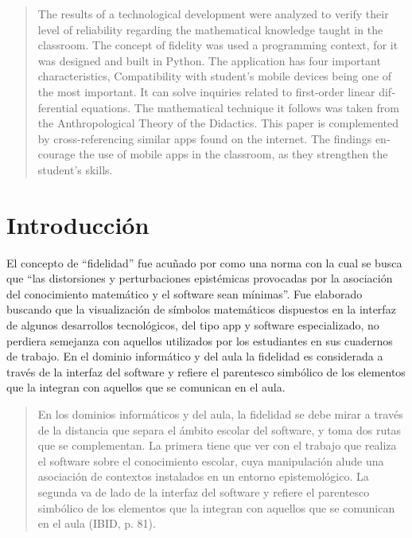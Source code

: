 \documentclass[spanish]{textolivre}
\begin{document}
\begin{polyabstract}
\begin{english}
\begin{abstract}
The results of a technological development were analyzed to verify their level of reliability regarding the mathematical knowledge taught in the classroom. The concept of fidelity was used a programming context, for it was designed and built in Python. The application has four important characteristics, Compatibility with student’s mobile devices being one of the most important. It can solve inquiries related to first-order linear differential equations. The mathematical technique it follows was taken from the Anthropological Theory of the Didactics. This paper is complemented by cross-referencing similar apps found on the internet. The findings encourage the use of mobile apps in the classroom, as they strengthen the student’s skills.

\end{abstract}
\end{english}

\end{polyabstract}


\section{Introducción}\label{sec-intro}
El concepto de “fidelidad” fue acuñado por \textcite{camachorios2019} como una norma con la cual se busca que “las distorsiones y perturbaciones epistémicas provocadas por la asociación del conocimiento matemático y el software sean mínimas”. Fue elaborado buscando que la visualización de símbolos matemáticos dispuestos en la interfaz de algunos desarrollos tecnológicos, del tipo app y software especializado, no perdiera semejanza con aquellos utilizados por los estudiantes en sus cuadernos de trabajo. En el dominio informático y del aula la fidelidad es considerada a través de la interfaz del software y refiere el parentesco simbólico de los elementos que la integran con aquellos que se comunican en el aula.

\begin{quote}
En los dominios informáticos y del aula, la fidelidad se debe mirar a través de la distancia que separa el ámbito escolar del software, y toma dos rutas que se complementan. La primera tiene que ver con el trabajo que realiza el software sobre el conocimiento escolar, cuya manipulación alude una asociación de contextos instalados en un entorno epistemológico. La segunda va de lado de la interfaz del software y refiere el parentesco simbólico de los elementos que la integran con aquellos que se comunican en el aula (IBID, p. 81).
\end{quote}
\end{document}
